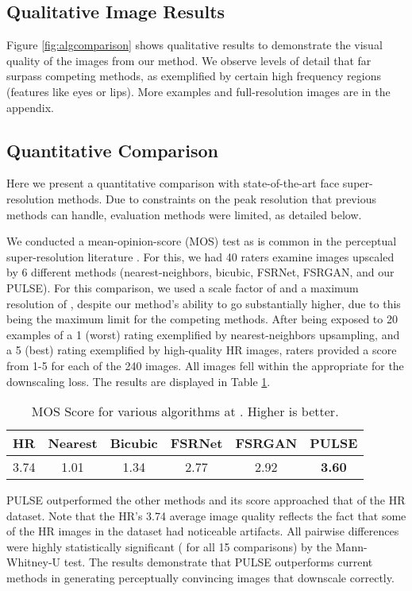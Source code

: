 \documentclass[10pt,twocolumn,letterpaper]{article}
\begin{document}
\subsection{Qualitative Image Results}
Figure \ref{fig:algcomparison} shows qualitative results to demonstrate the visual quality of the images from our method. We observe levels of detail that far surpass competing methods, as exemplified by certain high frequency regions (features like eyes or lips). More examples and full-resolution images are in the appendix.

\subsection{Quantitative Comparison} \label{quantcomp}
Here we present a quantitative comparison with state-of-the-art face super-resolution methods. Due to constraints on the peak resolution that previous methods can handle, evaluation methods were limited, as detailed below. 


We conducted a mean-opinion-score (MOS) test as is common in the perceptual super-resolution literature \cite{SRGAN,kim2019progressive}. For this, we had 40 raters examine images upscaled by 6 different methods (nearest-neighbors, bicubic, FSRNet, FSRGAN, and our PULSE). For this comparison, we used a scale factor of  and a maximum resolution of , despite our method's ability to go substantially higher, due to this being the maximum limit for the competing methods. After being exposed to 20 examples of a 1 (worst) rating exemplified by nearest-neighbors upsampling, and a 5 (best) rating exemplified by high-quality HR images, raters provided a score from 1-5 for each of the 240 images. All images fell within the appropriate  for the downscaling loss. The results are displayed in Table \ref{tab:MOS}. 
\begin{table}[]
\small{
\renewcommand{\arraystretch}{1.2}
\begin{tabular}{|c|c|c|c|c|c|}
\hline
HR   & Nearest & Bicubic & FSRNet & FSRGAN & PULSE \\ \hline \hline
3.74 & 1.01    & 1.34    & 2.77   & 2.92   & \textbf{3.60}  \\ \hline
\end{tabular}
}
\centering
\caption{MOS Score for various algorithms at . Higher is better.}
\label{tab:MOS}
\end{table}

PULSE outperformed the other methods and its score approached that of the HR dataset. Note that the HR's 3.74 average image quality reflects the fact that some of the HR images in the dataset had noticeable artifacts. All pairwise differences were highly statistically significant ( for all 15 comparisons) by the Mann-Whitney-U test. The results demonstrate that PULSE outperforms current methods in generating perceptually convincing images that downscale correctly. 
\end{document}
